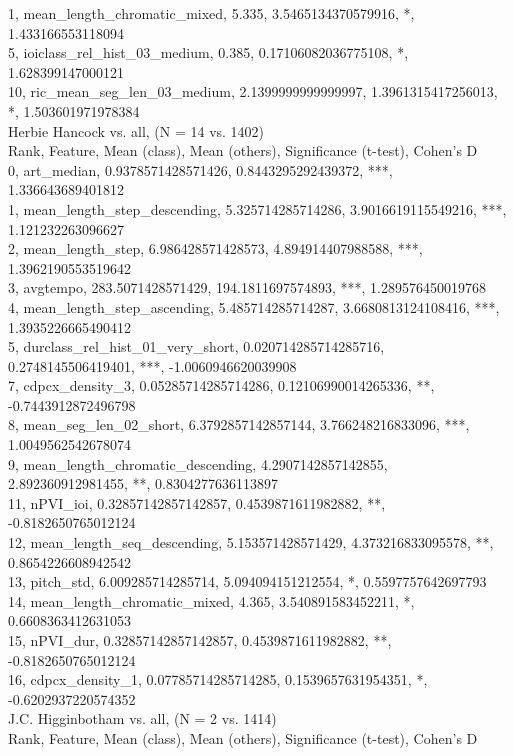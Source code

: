 1, mean_length_chromatic_mixed, 5.335, 3.5465134370579916, *, 1.433166553118094\\
5, ioiclass_rel_hist_03_medium, 0.385, 0.17106082036775108, *, 1.628399147000121\\
10, ric_mean_seg_len_03_medium, 2.1399999999999997, 1.3961315417256013, *, 1.503601971978384\\
Herbie Hancock vs. all, (N = 14 vs. 1402)\\
Rank, Feature, Mean (class), Mean (others), Significance (t-test), Cohen's D\\
0, art_median, 0.9378571428571426, 0.8443295292439372, ***, 1.336643689401812\\
1, mean_length_step_descending, 5.325714285714286, 3.9016619115549216, ***, 1.121232263096627\\
2, mean_length_step, 6.986428571428573, 4.894914407988588, ***, 1.3962190553519642\\
3, avgtempo, 283.5071428571429, 194.1811697574893, ***, 1.289576450019768\\
4, mean_length_step_ascending, 5.485714285714287, 3.6680813124108416, ***, 1.3935226665490412\\
5, durclass_rel_hist_01_very_short, 0.020714285714285716, 0.2748145506419401, ***, -1.0060946620039908\\
7, cdpcx_density_3, 0.05285714285714286, 0.12106990014265336, **, -0.7443912872496798\\
8, mean_seg_len_02_short, 6.3792857142857144, 3.766248216833096, ***, 1.0049562542678074\\
9, mean_length_chromatic_descending, 4.2907142857142855, 2.892360912981455, **, 0.8304277636113897\\
11, nPVI_ioi, 0.32857142857142857, 0.4539871611982882, **, -0.8182650765012124\\
12, mean_length_seq_descending, 5.153571428571429, 4.373216833095578, **, 0.8654226608942542\\
13, pitch_std, 6.009285714285714, 5.094094151212554, *, 0.5597757642697793\\
14, mean_length_chromatic_mixed, 4.365, 3.540891583452211, *, 0.6608363412631053\\
15, nPVI_dur, 0.32857142857142857, 0.4539871611982882, **, -0.8182650765012124\\
16, cdpcx_density_1, 0.07785714285714285, 0.1539657631954351, *, -0.6202937220574352\\
J.C. Higginbotham vs. all, (N = 2 vs. 1414)\\
Rank, Feature, Mean (class), Mean (others), Significance (t-test), Cohen's D\\
